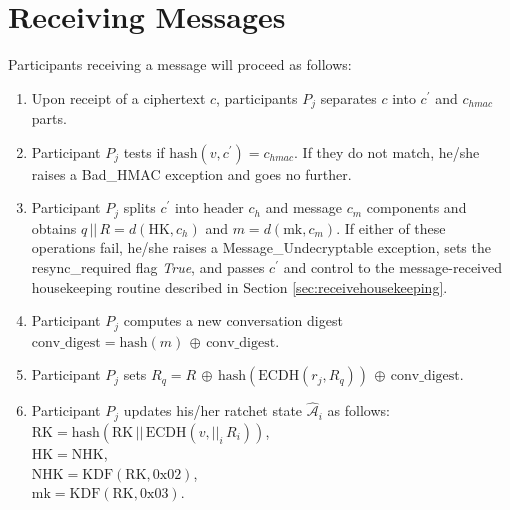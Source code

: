 \documentclass[%
preprint,
amsmath,amssymb,
aps,
prb,
floatfix,
]{revtex4-1}
\begin{document}
\section{\label{sec:receiving}Receiving Messages}
Participants receiving a message will proceed as follows:
\begin{enumerate}
\item Upon receipt of a ciphertext $c$, participants $P_j$ separates $c$ into
$c^\prime$ and $c_{hmac}$ parts.
\item Participant $P_j$ tests if $\mathrm{hash}(v, c^\prime) = c_{hmac}$. If
they do not match, he/she raises a Bad\_HMAC exception and goes no further.
\item Participant $P_j$ splits $c^\prime$ into header $c_h$ and message $c_m$ components
and obtains $q \, || \, R =
d(\mathrm{HK}, c_h)$ and $m = d(\mathrm{mk},
c_m)$. If either of these operations fail, he/she raises a Message\_Undecryptable
exception, sets the resync\_required flag \textit{True},
and passes $c^\prime$ and control to the message-received housekeeping routine described in
Section \ref{sec:receivehousekeeping}.
\item Participant $P_j$ computes a new conversation digest
$\mathrm{conv\_digest} = \mathrm{hash}(m) \, \oplus \, \mathrm{conv\_digest}$.
\item Participant $P_j$ sets $R_q = R \, \oplus \,
\mathrm{hash}(\mathrm{ECDH}(r_j, R_q)) \, \oplus \, \mathrm{conv\_digest}$.
\item Participant $P_j$ updates his/her ratchet state $\mathcal{\hat{A}}_i$ as
follows: \\
$\mathrm{RK} = \mathrm{hash}(\mathrm{RK} \, || \, \mathrm{ECDH}(v, ||_i
\, R_i))$, \\
$\mathrm{HK} = \mathrm{NHK}$, \\
$\mathrm{NHK} = \mathrm{KDF}(\mathrm{RK}, 0\mathrm{x}02)$, \\
$\mathrm{mk} = \mathrm{KDF}(\mathrm{RK}, 0\mathrm{x}03)$.

\end{enumerate}
\end{document}
